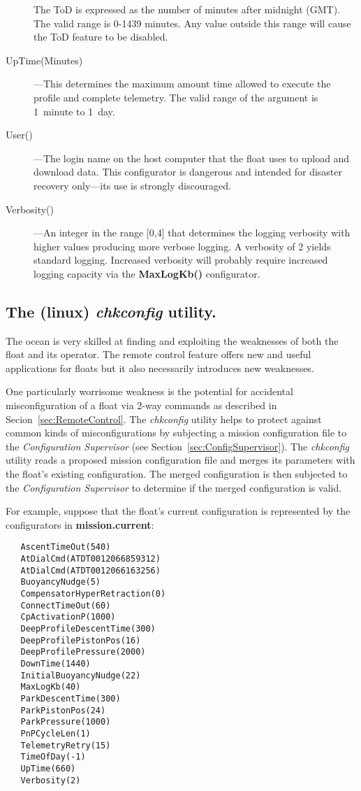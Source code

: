 \begin{description}
  The ToD is expressed as the number of minutes after midnight (GMT).  The
  valid range is 0-1439 minutes.  Any value outside this range will cause
  the ToD feature to be disabled.

\item[UpTime(Minutes)]---This determines the maximum amount time allowed to
  execute the profile and complete telemetry.  The valid range of the
  argument is 1~minute to 1~day.

\item[User()]---The login name on the host computer that the float uses to
  upload and download data.  This configurator is dangerous and intended for
  disaster recovery only---its use is strongly discouraged.

\item[Verbosity()]---An integer in the range [0,4] that determines the
  logging verbosity with higher values producing more verbose logging.  A
  verbosity of 2 yields standard logging.  Increased verbosity will probably
  require increased logging capacity via the \textbf{MaxLogKb()}
  configurator.

\end{description}

\subsection{The (linux) \emph{chkconfig} utility.}
\label{sec:MissionNazi}

The ocean is very skilled at finding and exploiting the weaknesses of both
the float and its operator.  The remote control feature offers new and
useful applications for floats but it also necessarily introduces new
weaknesses.  

One particularly worrisome weakness is the potential for accidental
misconfiguration of a float via 2-way commands as described in
Secion~\ref{sec:RemoteControl}.  The \emph{chkconfig} utility helps to
protect against common kinds of misconfigurations by subjecting a mission
configuration file to the \emph{Configuration Supervisor} (see
Section~\ref{sec:ConfigSupervisor}).  The \emph{chkconfig} utility reads a
proposed mission configuration file and merges its parameters with the
float's existing configuration.  The merged configuration is then subjected
to the \emph{Configuration Supervisor} to determine if the merged
configuration is valid.

For example, suppose that the float's current configuration is represented
by the configurators in \textbf{mission.current}:
\begin{verbatim}
   AscentTimeOut(540)
   AtDialCmd(ATDT0012066859312)
   AtDialCmd(ATDT0012066163256) 
   BuoyancyNudge(5)
   CompensatorHyperRetraction(0)
   ConnectTimeOut(60)
   CpActivationP(1000)
   DeepProfileDescentTime(300)
   DeepProfilePistonPos(16)
   DeepProfilePressure(2000)
   DownTime(1440)
   InitialBuoyancyNudge(22)
   MaxLogKb(40) 
   ParkDescentTime(300)
   ParkPistonPos(24)
   ParkPressure(1000)
   PnPCycleLen(1)
   TelemetryRetry(15)
   TimeOfDay(-1)
   UpTime(660)
   Verbosity(2)
\end{verbatim}

